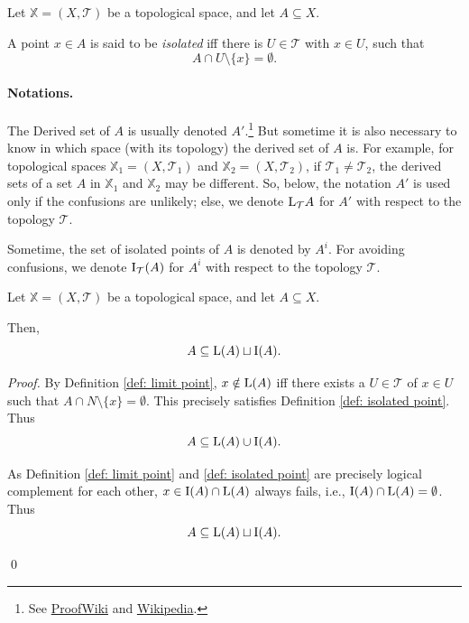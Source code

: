 \begin{definition}
	\label{def: isolated point}
	Let $\mathbb X = (X, \mathcal T)$ be a topological space, and let $A \subseteq X$.
	
	A point $x \in A$ is said to be \textit{isolated} iff there is $U \in \mathcal T$ with $x \in U$, such that
	$$
	A \cap U \setminus \{x\} = \emptyset.
	$$
\end{definition}


\paragraph{Notations.}
The Derived set of $A$ is usually denoted $A'$.\footnote{See \href{https://proofwiki.org/wiki/Definition:Derived_Set}{ProofWiki} and \href{https://en.wikipedia.org/wiki/Derived_set_(mathematics)}{Wikipedia}.}
But sometime it is also necessary to know in which space (with its topology) the derived set of $A$ is. For example, for topological spaces $\mathbb X_1 = (X, \mathcal T_1)$ and $\mathbb X_2 = (X, \mathcal T_2)$, if $\mathcal T_1 \ne \mathcal T_2$, the derived sets of a set $A$ in $\mathbb X_1$ and $\mathbb X_2$ may be different. So, below, the notation $A'$ is used only if the confusions are unlikely; else, we denote $\mathrm{L}_\mathcal T A$ for $A'$ with respect to the topology $\mathcal T$.

Sometime, the set of isolated points of $A$ is denoted by $A^i$. For avoiding confusions, we denote $\mathrm{I}_\mathcal T(A)$ for $A^i$ with respect to the topology $\mathcal T$.


\begin{proposition}
	\label{prop: disjoint union of isolated set and derived set}
	Let $\mathbb X = (X, \mathcal T)$ be a topological space, and let $A \subseteq X$. 
	
	Then,
	$$
	A \subseteq \mathrm{L} (A) \sqcup \mathrm{I} (A).
	$$
	
	\begin{proof}
		By Definition \ref{def: limit point}, $x \notin \mathrm{L}(A)$ iff there exists a $U \in \mathcal T$ of $x \in U$ such that $A \cap N \setminus \{x\} = \emptyset$. This precisely satisfies Definition \ref{def: isolated point}. Thus
		$$
		A \subseteq \mathrm{L}(A) \cup \mathrm{I}(A).
		$$
		
		As Definition \ref{def: limit point} and \ref{def: isolated point} are precisely logical complement for each other, $x \in \mathrm{I} (A) \cap \mathrm{L}(A)$ always fails, i.e., $\mathrm{I}(A) \cap \mathrm{L}(A) = \emptyset$. Thus
		$$
		A \subseteq \mathrm{L} (A) \sqcup \mathrm{I} (A).
		$$
		
		\qed
	\end{proof}
\end{proposition}


